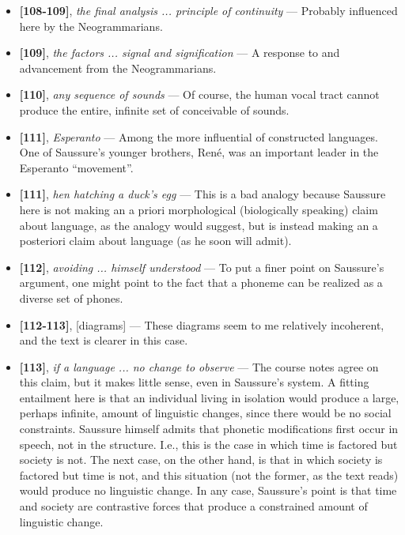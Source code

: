 \documentclass[12pt]{article}
\begin{document}
\begin{itemize}
\item \textbf{[108-109]}, \textit{the final analysis ... principle of continuity} --- Probably influenced here by the Neogrammarians.

\item \textbf{[109]}, \textit{the factors ... signal and signification} --- A response to and advancement from the Neogrammarians.

\item \textbf{[110]}, \textit{any sequence of sounds} --- Of course, the human vocal tract cannot produce the entire, infinite set of conceivable of sounds.

\item \textbf{[111]}, \textit{Esperanto} --- Among the more influential of constructed languages. One of Saussure's younger brothers, Ren\'{e}, was an important leader in the Esperanto ``movement''. 

\item \textbf{[111]}, \textit{hen hatching a duck's egg} --- This is a bad analogy because Saussure here is not making an a priori morphological (biologically speaking) claim about language, as the analogy would suggest, but is instead making an a posteriori claim about language (as he soon will admit). 

\item \textbf{[112]}, \textit{avoiding ... himself understood} --- To put a finer point on Saussure's argument, one might point to the fact that a phoneme can be realized as a diverse set of phones.

\item \textbf{[112-113]}, [diagrams] --- These diagrams seem to me relatively incoherent, and the text is clearer in this case.

\item \textbf{[113]}, \textit{if a language ... no change to observe} --- The course notes agree on this claim, but it makes little sense, even in Saussure's system. A fitting entailment here is that an individual living in isolation would produce a large, perhaps infinite, amount of linguistic changes, since there would be no social constraints. Saussure himself admits that phonetic modifications first occur in speech, not in the structure. I.e., this is the case in which time is factored but society is not. The next case, on the other hand, is that in which society is factored but time is not, and this situation (not the former, as the text reads) would produce no linguistic change. In any case, Saussure's point is that time and society are contrastive forces that produce a constrained amount of linguistic change.

\end{itemize}
\end{document}
